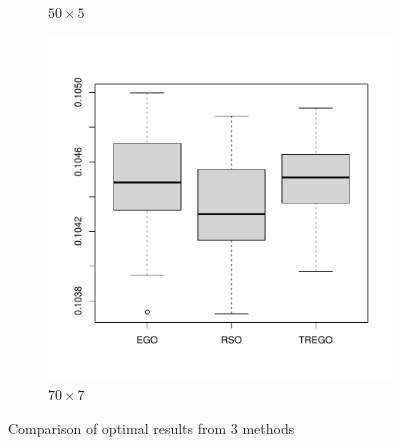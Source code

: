 \documentclass [PhD] {package/uclathes}
\begin{document}
\begin{figure}
\begin{subfigure}[b]{.3\textwidth}
\caption{$50\times 5$}
\end{subfigure}
\begin{subfigure}[b]{.3\textwidth}
\centering
\includegraphics[]{chapters/RSO/pdfs/box70x7}
\caption{$70\times 7$}
\end{subfigure}
\caption{Comparison of optimal results from 3 methods}
\label{fig:optimal}
\end{figure}

\end{document}
